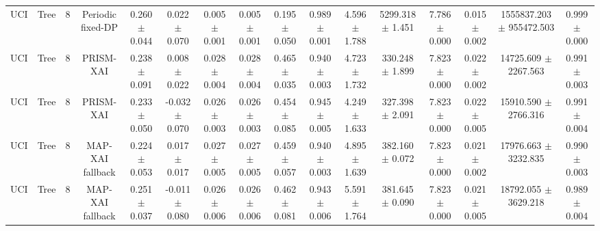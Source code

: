 \begin{tabular}{lccccccccccccccc}
UCI & Tree & 8 & Periodic fixed-DP & 0.260 $\pm$ 0.044 & 0.022 $\pm$ 0.070 & 0.005 $\pm$ 0.001 & 0.005 $\pm$ 0.001 & 0.195 $\pm$ 0.050 & 0.989 $\pm$ 0.001 & 4.596 $\pm$ 1.788 & 5299.318 $\pm$ 1.451 & 7.786 $\pm$ 0.000 & 0.015 $\pm$ 0.002 & 1555837.203 $\pm$ 955472.503 & 0.999 $\pm$ 0.000 \\
UCI & Tree & 8 & PRISM-XAI & 0.238 $\pm$ 0.091 & 0.008 $\pm$ 0.022 & 0.028 $\pm$ 0.004 & 0.028 $\pm$ 0.004 & 0.465 $\pm$ 0.035 & 0.940 $\pm$ 0.003 & 4.723 $\pm$ 1.732 & 330.248 $\pm$ 1.899 & 7.823 $\pm$ 0.000 & 0.022 $\pm$ 0.002 & 14725.609 $\pm$ 2267.563 & 0.991 $\pm$ 0.003 \\
UCI & Tree & 8 & PRISM-XAI & 0.233 $\pm$ 0.050 & -0.032 $\pm$ 0.070 & 0.026 $\pm$ 0.003 & 0.026 $\pm$ 0.003 & 0.454 $\pm$ 0.085 & 0.945 $\pm$ 0.005 & 4.249 $\pm$ 1.633 & 327.398 $\pm$ 2.091 & 7.823 $\pm$ 0.000 & 0.022 $\pm$ 0.005 & 15910.590 $\pm$ 2766.316 & 0.991 $\pm$ 0.004 \\
UCI & Tree & 8 & MAP-XAI fallback & 0.224 $\pm$ 0.053 & 0.017 $\pm$ 0.017 & 0.027 $\pm$ 0.005 & 0.027 $\pm$ 0.005 & 0.459 $\pm$ 0.057 & 0.940 $\pm$ 0.003 & 4.895 $\pm$ 1.639 & 382.160 $\pm$ 0.072 & 7.823 $\pm$ 0.000 & 0.021 $\pm$ 0.002 & 17976.663 $\pm$ 3232.835 & 0.990 $\pm$ 0.003 \\
UCI & Tree & 8 & MAP-XAI fallback & 0.251 $\pm$ 0.037 & -0.011 $\pm$ 0.080 & 0.026 $\pm$ 0.006 & 0.026 $\pm$ 0.006 & 0.462 $\pm$ 0.081 & 0.943 $\pm$ 0.006 & 5.591 $\pm$ 1.764 & 381.645 $\pm$ 0.090 & 7.823 $\pm$ 0.000 & 0.021 $\pm$ 0.005 & 18792.055 $\pm$ 3629.218 & 0.989 $\pm$ 0.004 \\
\bottomrule
\end{tabular}
